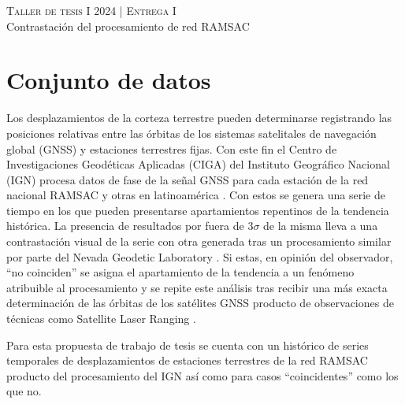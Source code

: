 \documentclass[11pt,spanish,a4paper]{article}
\begin{document}
\begin{center}
  \textsc{\large Taller de tesis I 2024 | Entrega I}\\
	Contrastación del procesamiento de red RAMSAC
\end{center}


\section*{Conjunto de datos}

Los desplazamientos de la corteza terrestre pueden determinarse registrando las posiciones relativas entre las órbitas de los sistemas satelitales de navegación global (GNSS) y estaciones terrestres fijas.
Con este fin el Centro de Investigaciones Geodéticas Aplicadas (CIGA) del Instituto Geográfico Nacional (IGN) procesa datos de fase de la señal GNSS para cada estación de la red nacional RAMSAC y otras en latinoamérica \cite{noauthor_centro_nodate}.
Con estos se genera una serie de tiempo en los que pueden presentarse apartamientos repentinos de la tendencia histórica.
La presencia de resultados por fuera de \(3 \sigma\) de la misma lleva a una contrastación visual de la serie con otra generada tras un procesamiento similar por parte del Nevada Geodetic Laboratory \cite{noauthor_magnet_nodate}.
Si estas, en opinión del observador, ``no coinciden'' se asigna el apartamiento de la tendencia a un fenómeno atribuible al procesamiento y se repite este análisis tras recibir una más exacta determinación de las órbitas de los satélites GNSS producto de observaciones de técnicas como Satellite Laser Ranging \cite{noauthor_aggo_nodate}. 

Para esta propuesta de trabajo de tesis se cuenta con un histórico de series temporales de desplazamientos de estaciones terrestres de la red RAMSAC producto del procesamiento del IGN así como para casos ``coincidentes'' como los que no.






\end{document}
